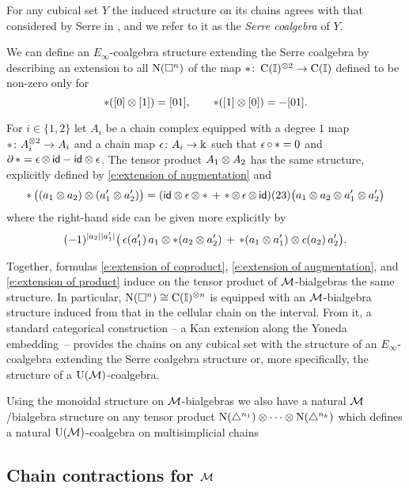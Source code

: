 For any cubical set $Y$ the induced structure on its chains agrees with that considered by Serre in \cite{serre1951homologie}, and we refer to it as the \textit{Serre coalgebra} of $Y$.

We can define an $E_\infty$-coalgebra structure extending the Serre coalgebra by describing an extension to all $\operatorname{N}(\square^n)$ of the map $\ast \colon \operatorname{C}(\mathbb{I})^{\otimes 2} \to \operatorname{C}(\mathbb{I})$ defined to be non-zero only for
\[
\ast([0] \otimes [1]) = [01], \qquad
\ast([1] \otimes [0]) = - [01].
\]

For $i \in \{1,2\}$ let $A_i$ be a chain complex equipped with a degree $1$ map $\operatorname{\ast} \colon A_i^{\otimes 2} \to A_i$ and a chain map $\operatorname{\epsilon} \colon A_i \to \Bbbk$ such that $\operatorname{\epsilon} \circ \operatorname{\ast} = 0$ and $\partial \operatorname{\ast} = \operatorname{\epsilon} \otimes \, \mathsf{id} - \mathsf{id} \otimes \operatorname{\epsilon}$.
The tensor product $A_1 \otimes A_2$ has the same structure, explicitly defined by \eqref{e:extension of augmentation} and
\begin{equation} \label{e:extension of product}
\operatorname{\ast} \big( (a_1 \otimes a_2) \otimes (a_1^\prime \otimes a_2^\prime)\big) =
(\mathsf{id} \otimes \operatorname{\epsilon} \otimes \ast \, + \, \operatorname{\ast} \otimes \operatorname{\epsilon} \otimes \, \mathsf{id})(23)
\big( a_1 \otimes a_2 \otimes a_1^\prime \otimes a_2^\prime \big)
\end{equation}
where the right-hand side can be given more explicitly by
\[
(-1)^{\lvert a_2\rvert \lvert a_1^\prime\rvert} \big( \operatorname{\epsilon}(a_1^\prime) \, a_1 \otimes \ast (a_2 \otimes a_2^\prime)  \, + \, \operatorname{\ast}(a_1 \otimes a_1^\prime) \otimes \operatorname{\epsilon}(a_2) \, a_2^\prime \big).
\]

Together, formulas \eqref{e:extension of coproduct}, \eqref{e:extension of augmentation}, and \eqref{e:extension of product} induce on the tensor product of $\operatorname{\mathcal{M}}$-bialgebras the same structure.
In particular, $\operatorname{N}(\square^n) \cong \operatorname{C}(\mathbb{I})^{\otimes n}$ is equipped with an $\operatorname{\mathcal{M}}$-bialgebra structure induced from that in the cellular chain on the interval.
From it, a standard categorical construction -- a Kan extension along the Yoneda embedding~-- provides the chains on any cubical set with the structure of an $E_\infty$-coalgebra extending the Serre coalgebra structure or, more specifically, the structure of a $\operatorname{\mathrm{U}(\mathcal{M})}$-coalgebra.

Using the monoidal structure on $\operatorname{\mathcal{M}}$-bialgebras we also have a natural $\operatorname{\mathcal{M}}$\-/bialgebra structure on any tensor product $\operatorname{N}(\triangle^{n_1}) \otimes \dots \otimes \operatorname{N}(\triangle^{n_k})$ which defines a natural $\operatorname{\mathrm{U}(\mathcal{M})}$-coalgebra on multisimplicial chains \cite{gugenheim1957supercomplexes, salvatore2020multisimplicial}

\subsection{Chain contractions for $\operatorname{\mathcal{M}}$} \label{ss:homology of M}

